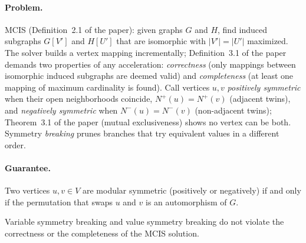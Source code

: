 \paragraph{Problem.}
MCIS (Definition~2.1 of the paper): given graphs $G$ and $H$, find induced subgraphs
$G[V']$ and $H[U']$ that are isomorphic with $|V'|=|U'|$ maximized. The solver builds
a vertex mapping incrementally; Definition~3.1 of the paper demands two properties of
any acceleration: \emph{correctness} (only mappings between isomorphic induced
subgraphs are deemed valid) and \emph{completeness} (at least one mapping of maximum
cardinality is found). Call vertices $u,v$ \emph{positively symmetric} when their open
neighborhoods coincide, $N^{+}(u)=N^{+}(v)$ (adjacent twins), and \emph{negatively
symmetric} when $N^{-}(u)=N^{-}(v)$ (non-adjacent twins); Theorem~3.1 of the paper
(mutual exclusiveness) shows no vertex can be both. Symmetry \emph{breaking} prunes
branches that try equivalent values in a different order.

\paragraph{Guarantee.}

\begin{lemma}
\label{lem:exc-009-autom}
Two vertices $u,v\in V$ are modular symmetric (positively or negatively) if and only
if the permutation that swaps $u$ and $v$ is an automorphism of $G$. \eop
\end{lemma}

\begin{theorem}\label{thm:exc-009-safe}
Variable symmetry breaking and value symmetry breaking do not violate the correctness
or the completeness of the MCIS solution. \eop
\end{theorem}

